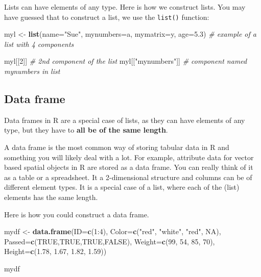 \documentclass[]{book}
\newenvironment{Shaded}{\begin{snugshade}}{\end{snugshade}}
\newcommand{\KeywordTok}[1]{\textcolor[rgb]{0.13,0.29,0.53}{\textbf{{#1}}}}
\newcommand{\DataTypeTok}[1]{\textcolor[rgb]{0.13,0.29,0.53}{{#1}}}
\newcommand{\DecValTok}[1]{\textcolor[rgb]{0.00,0.00,0.81}{{#1}}}
\newcommand{\FloatTok}[1]{\textcolor[rgb]{0.00,0.00,0.81}{{#1}}}
\newcommand{\StringTok}[1]{\textcolor[rgb]{0.31,0.60,0.02}{{#1}}}
\newcommand{\CommentTok}[1]{\textcolor[rgb]{0.56,0.35,0.01}{\textit{{#1}}}}
\newcommand{\OtherTok}[1]{\textcolor[rgb]{0.56,0.35,0.01}{{#1}}}
\newcommand{\NormalTok}[1]{{#1}}
\theoremstyle{definition}
\theoremstyle{definition}
\theoremstyle{remark}
\begin{document}
Lists can have elements of any type. Here is how we construct lists. You
may have guessed that to construct a list, we use the \texttt{list()}
function:

\begin{Shaded}
\begin{Highlighting}[]
\NormalTok{myl <-}\StringTok{ }\KeywordTok{list}\NormalTok{(}\DataTypeTok{name=}\StringTok{"Sue"}\NormalTok{, }\DataTypeTok{mynumbers=}\NormalTok{a, }\DataTypeTok{mymatrix=}\NormalTok{y, }\DataTypeTok{age=}\FloatTok{5.3}\NormalTok{) }\CommentTok{# example of a list with 4 components}

\NormalTok{myl[[}\DecValTok{2}\NormalTok{]] }\CommentTok{# 2nd component of the list}
\NormalTok{myl[[}\StringTok{"mynumbers"}\NormalTok{]] }\CommentTok{# component named mynumbers in list}
\end{Highlighting}
\end{Shaded}

\subsection{Data frame}\label{data-frame}

Data frames in R are a special case of lists, as they can have elements
of any type, but they have to \textbf{all be of the same length}.

A data frame is the most common way of storing tabular data in R and
something you will likely deal with a lot. For example, attribute data
for vector based spatial objects in R are stored as a data frame. You
can really think of it as a table or a spreadsheet. It a 2-dimensional
structure and columns can be of different element types. It is a special
case of a list, where each of the (list) elements has the same length.

Here is how you could construct a data frame.

\begin{Shaded}
\begin{Highlighting}[]
\NormalTok{mydf <-}\StringTok{ }\KeywordTok{data.frame}\NormalTok{(}\DataTypeTok{ID=}\KeywordTok{c}\NormalTok{(}\DecValTok{1}\NormalTok{:}\DecValTok{4}\NormalTok{),}
                   \DataTypeTok{Color=}\KeywordTok{c}\NormalTok{(}\StringTok{"red"}\NormalTok{, }\StringTok{"white"}\NormalTok{, }\StringTok{"red"}\NormalTok{, }\OtherTok{NA}\NormalTok{),}
                   \DataTypeTok{Passed=}\KeywordTok{c}\NormalTok{(}\OtherTok{TRUE}\NormalTok{,}\OtherTok{TRUE}\NormalTok{,}\OtherTok{TRUE}\NormalTok{,}\OtherTok{FALSE}\NormalTok{),}
                   \DataTypeTok{Weight=}\KeywordTok{c}\NormalTok{(}\DecValTok{99}\NormalTok{, }\DecValTok{54}\NormalTok{, }\DecValTok{85}\NormalTok{, }\DecValTok{70}\NormalTok{),}
                   \DataTypeTok{Height=}\KeywordTok{c}\NormalTok{(}\FloatTok{1.78}\NormalTok{, }\FloatTok{1.67}\NormalTok{, }\FloatTok{1.82}\NormalTok{, }\FloatTok{1.59}\NormalTok{))}

\NormalTok{mydf}
\end{Highlighting}
\end{Shaded}
\end{document}
